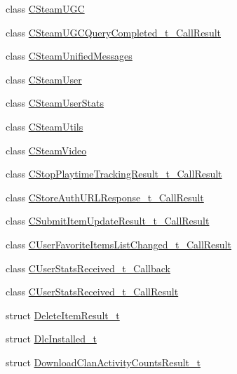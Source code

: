 \begin{DoxyCompactItemize}
\item 
class \hyperlink{class_valve_1_1_steamworks_1_1_c_steam_u_g_c}{C\+Steam\+U\+GC}
\item 
class \hyperlink{class_valve_1_1_steamworks_1_1_c_steam_u_g_c_query_completed__t___call_result}{C\+Steam\+U\+G\+C\+Query\+Completed\+\_\+t\+\_\+\+Call\+Result}
\item 
class \hyperlink{class_valve_1_1_steamworks_1_1_c_steam_unified_messages}{C\+Steam\+Unified\+Messages}
\item 
class \hyperlink{class_valve_1_1_steamworks_1_1_c_steam_user}{C\+Steam\+User}
\item 
class \hyperlink{class_valve_1_1_steamworks_1_1_c_steam_user_stats}{C\+Steam\+User\+Stats}
\item 
class \hyperlink{class_valve_1_1_steamworks_1_1_c_steam_utils}{C\+Steam\+Utils}
\item 
class \hyperlink{class_valve_1_1_steamworks_1_1_c_steam_video}{C\+Steam\+Video}
\item 
class \hyperlink{class_valve_1_1_steamworks_1_1_c_stop_playtime_tracking_result__t___call_result}{C\+Stop\+Playtime\+Tracking\+Result\+\_\+t\+\_\+\+Call\+Result}
\item 
class \hyperlink{class_valve_1_1_steamworks_1_1_c_store_auth_u_r_l_response__t___call_result}{C\+Store\+Auth\+U\+R\+L\+Response\+\_\+t\+\_\+\+Call\+Result}
\item 
class \hyperlink{class_valve_1_1_steamworks_1_1_c_submit_item_update_result__t___call_result}{C\+Submit\+Item\+Update\+Result\+\_\+t\+\_\+\+Call\+Result}
\item 
class \hyperlink{class_valve_1_1_steamworks_1_1_c_user_favorite_items_list_changed__t___call_result}{C\+User\+Favorite\+Items\+List\+Changed\+\_\+t\+\_\+\+Call\+Result}
\item 
class \hyperlink{class_valve_1_1_steamworks_1_1_c_user_stats_received__t___callback}{C\+User\+Stats\+Received\+\_\+t\+\_\+\+Callback}
\item 
class \hyperlink{class_valve_1_1_steamworks_1_1_c_user_stats_received__t___call_result}{C\+User\+Stats\+Received\+\_\+t\+\_\+\+Call\+Result}
\item 
struct \hyperlink{struct_valve_1_1_steamworks_1_1_delete_item_result__t}{Delete\+Item\+Result\+\_\+t}
\item 
struct \hyperlink{struct_valve_1_1_steamworks_1_1_dlc_installed__t}{Dlc\+Installed\+\_\+t}
\item 
struct \hyperlink{struct_valve_1_1_steamworks_1_1_download_clan_activity_counts_result__t}{Download\+Clan\+Activity\+Counts\+Result\+\_\+t}

\end{DoxyCompactItemize}
